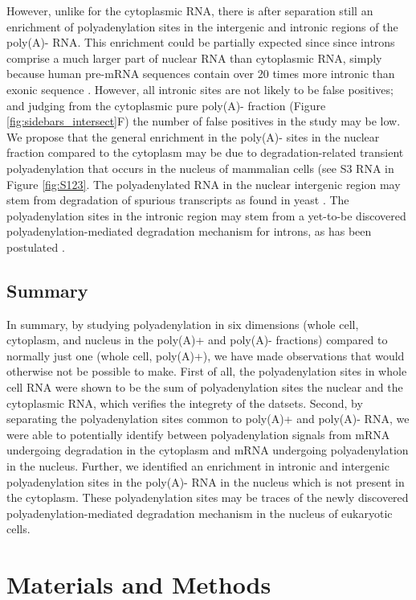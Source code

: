 However, unlike for the cytoplasmic RNA, there is after separation still an
enrichment of polyadenylation sites in the intergenic and intronic regions of
the poly(A)- RNA. This enrichment could be partially expected since since
introns comprise a much larger part of nuclear RNA than cytoplasmic RNA, simply
because human pre-mRNA sequences contain over 20 times more intronic than
exonic sequence \cite{venter_sequence_2001}. However, all intronic sites are
not likely to be false positives; and judging from the cytoplasmic pure
poly(A)- fraction (Figure \ref{fig:sidebars_intersect}F) the number of false
positives in the study may be low. We propose that the general enrichment in
the poly(A)- sites in the nuclear fraction compared to the cytoplasm may be due
to degradation-related transient polyadenylation that occurs in the nucleus of
mammalian cells \cite{lemay_nuclear_2010} (see S3 RNA in Figure \ref{fig:S123}.
The polyadenylated RNA in the nuclear intergenic region may stem from
degradation of spurious transcripts as found in yeast
\cite{wyers_cryptic_2005}. The polyadenylation sites in the intronic region may
stem from a yet-to-be discovered polyadenylation-mediated degradation mechanism
for introns, as has been postulated \cite{schmidt_polyadenylation_2010}.

\subsection{Summary}
In summary, by studying polyadenylation in six dimensions (whole cell,
cytoplasm, and nucleus in the poly(A)+ and poly(A)- fractions) compared to
normally just one (whole cell, poly(A)+), we have made observations that would
otherwise not be possible to make. First of all, the polyadenylation sites in
whole cell RNA were shown to be the sum of polyadenylation sites the nuclear
and the cytoplasmic RNA, which verifies the integrety of the datsets. Second,
by separating the polyadenylation sites common to poly(A)+ and poly(A)- RNA, we
were able to potentially identify between polyadenylation signals from mRNA
undergoing degradation in the cytoplasm and mRNA undergoing polyadenylation in
the nucleus. Further, we identified an enrichment in intronic and intergenic
polyadenylation sites in the poly(A)- RNA in the nucleus which is not present
in the cytoplasm. These polyadenylation sites may be traces of the newly
discovered polyadenylation-mediated degradation mechanism in the nucleus of
eukaryotic cells.  

\section{Materials and Methods}
